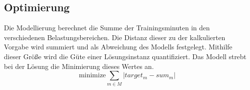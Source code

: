 \subsection{Optimierung}
Die Modellierung berechnet die Summe der Trainingsminuten in den verschiedenen Belastungsbereichen. Die Distanz dieser zu der kalkulierten Vorgabe wird summiert und als Abweichung des Modells festgelegt. Mithilfe dieser Größe wird die Güte einer Lösungsinstanz quantifiziert. Das Modell strebt bei der Lösung die Minimierung dieses Wertes an.
\begin{equation}
    \text{minimize} \sum_{m\in M} |target_m - sum_m|
\end{equation} 

